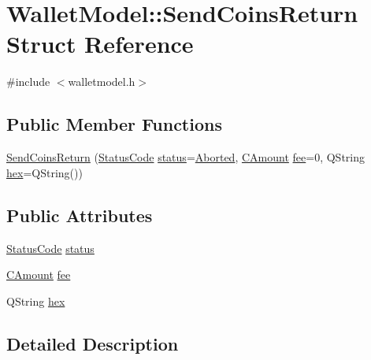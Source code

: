 \hypertarget{struct_wallet_model_1_1_send_coins_return}{}\section{Wallet\+Model\+:\+:Send\+Coins\+Return Struct Reference}
\label{struct_wallet_model_1_1_send_coins_return}


{\ttfamily \#include $<$walletmodel.\+h$>$}

\subsection*{Public Member Functions}
\begin{DoxyCompactItemize}
\item 
\hyperlink{struct_wallet_model_1_1_send_coins_return_a2efac711e103345553ec58b0d0129c3d}{Send\+Coins\+Return} (\hyperlink{class_wallet_model_afb93f64411320dce4692c2190b7d35cc}{Status\+Code} \hyperlink{struct_wallet_model_1_1_send_coins_return_af7d485f3ae8e2baef7439c53c2adbd35}{status}=\hyperlink{class_wallet_model_afb93f64411320dce4692c2190b7d35ccac296492b54550e5418c6558e3517adc1}{Aborted}, \hyperlink{amount_8h_a4eaf3a5239714d8c45b851527f7cb564}{C\+Amount} \hyperlink{struct_wallet_model_1_1_send_coins_return_aaa736f53bb14db7e0b0df1cdeccb4a24}{fee}=0, Q\+String \hyperlink{struct_wallet_model_1_1_send_coins_return_a532b77588e64f9ed1d12fb1a2f58ce75}{hex}=Q\+String())
\end{DoxyCompactItemize}
\subsection*{Public Attributes}
\begin{DoxyCompactItemize}
\item 
\hyperlink{class_wallet_model_afb93f64411320dce4692c2190b7d35cc}{Status\+Code} \hyperlink{struct_wallet_model_1_1_send_coins_return_af7d485f3ae8e2baef7439c53c2adbd35}{status}
\item 
\hyperlink{amount_8h_a4eaf3a5239714d8c45b851527f7cb564}{C\+Amount} \hyperlink{struct_wallet_model_1_1_send_coins_return_aaa736f53bb14db7e0b0df1cdeccb4a24}{fee}
\item 
Q\+String \hyperlink{struct_wallet_model_1_1_send_coins_return_a532b77588e64f9ed1d12fb1a2f58ce75}{hex}
\end{DoxyCompactItemize}


\subsection{Detailed Description}


